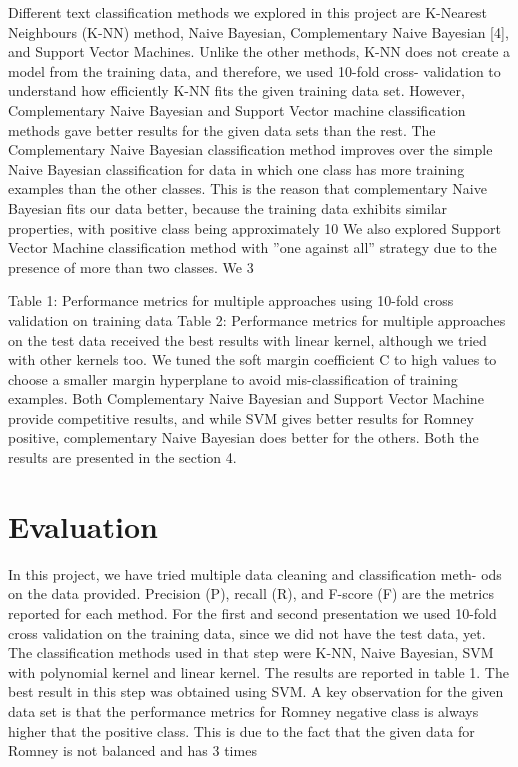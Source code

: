 \documentclass[letterpaper, 12pt]{article}
\begin{document}
Different text classification methods we explored in this project are K-Nearest Neighbours (K-NN) method, Naive Bayesian, Complementary Naive Bayesian [4], and Support Vector Machines. Unlike the other methods, K-NN does not create a model from the training data, and therefore, we used 10-fold cross- validation to understand how efficiently K-NN fits the given training data set. However, Complementary Naive Bayesian and Support Vector machine classification methods gave better results for the given data sets than the rest.
The Complementary Naive Bayesian classification method improves over the simple Naive Bayesian classification for data in which one class has more training examples than the other classes. This is the reason that complementary Naive Bayesian fits our data better, because the training data exhibits similar properties, with positive class being approximately 10%
We also explored Support Vector Machine classification method with ”one against all” strategy due to the presence of more than two classes. We
3

        Table 1: Performance metrics for multiple approaches using 10-fold cross validation on training data
Table 2: Performance metrics for multiple approaches on the test data
received the best results with linear kernel, although we tried with other kernels too. We tuned the soft margin coefficient C to high values to choose a smaller margin hyperplane to avoid mis-classification of training examples.
Both Complementary Naive Bayesian and Support Vector Machine provide competitive results, and while SVM gives better results for Romney positive, complementary Naive Bayesian does better for the others. Both the results are presented in the section 4.


\section{Evaluation}
In this project, we have tried multiple data cleaning and classification meth- ods on the data provided. Precision (P), recall (R), and F-score (F) are the metrics reported for each method. For the first and second presentation we used 10-fold cross validation on the training data, since we did not have the test data, yet. The classification methods used in that step were K-NN, Naive Bayesian, SVM with polynomial kernel and linear kernel. The results are reported in table 1. The best result in this step was obtained using SVM. A key observation for the given data set is that the performance metrics for Romney negative class is always higher that the positive class. This is due to the fact that the given data for Romney is not balanced and has 3 times
\end{document}
